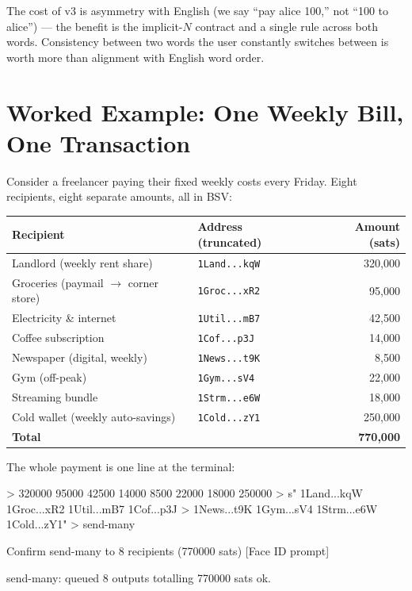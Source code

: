\documentclass[a4paper, 11pt]{article}
\begin{document}
The cost of v3 is asymmetry with English (we say ``pay alice 100,'' not ``100 to alice'') --- the benefit is the implicit-$N$ contract and a single rule across both words. Consistency between two words the user constantly switches between is worth more than alignment with English word order.

\section{Worked Example: One Weekly Bill, One Transaction}

Consider a freelancer paying their fixed weekly costs every Friday. Eight recipients, eight separate amounts, all in BSV:

\begin{center}
\begin{tabular}{@{} l l r @{}}
\toprule
\textbf{Recipient}                  & \textbf{Address (truncated)}    & \textbf{Amount (sats)} \\
\midrule
Landlord (weekly rent share)        & \texttt{1Land...kqW}            & 320{,}000 \\
Groceries (paymail $\rightarrow$ corner store) & \texttt{1Groc...xR2}    & 95{,}000 \\
Electricity \& internet             & \texttt{1Util...mB7}            & 42{,}500 \\
Coffee subscription                 & \texttt{1Cof...p3J}             & 14{,}000 \\
Newspaper (digital, weekly)         & \texttt{1News...t9K}            & 8{,}500 \\
Gym (off-peak)                      & \texttt{1Gym...sV4}             & 22{,}000 \\
Streaming bundle                    & \texttt{1Strm...e6W}            & 18{,}000 \\
Cold wallet (weekly auto-savings)   & \texttt{1Cold...zY1}            & 250{,}000 \\
\midrule
\textbf{Total}                      &                                 & \textbf{770{,}000} \\
\bottomrule
\end{tabular}
\end{center}

The whole payment is one line at the terminal:

\begin{forthbox}
  > 320000 95000 42500 14000 8500 22000 18000 250000
  > s" 1Land...kqW 1Groc...xR2 1Util...mB7 1Cof...p3J
  >    1News...t9K 1Gym...sV4 1Strm...e6W 1Cold...zY1"
  > send-many

  Confirm send-many to 8 recipients (770000 sats)
   [Face ID prompt]

  send-many: queued 8 outputs totalling 770000 sats
   ok.
\end{forthbox}
\end{document}
